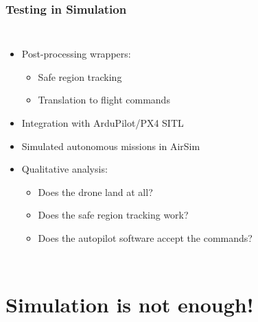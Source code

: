 \documentclass[aspectratio=169]{rubeamer}
\newcommand{\nologo}{\setbeamertemplate{logo}{}}
\newif\ifpause
\newcommand{\mypause}{\ifpause \pause \fi}
\begin{document}
\begin{frame}
  \frametitle{Testing in Simulation}
  \begin{columns}
    \begin{itemize}
      \item Post-processing wrappers:
      \begin{itemize}
        \item Safe region tracking
        \mypause
        \item Translation to flight commands
      \end{itemize}
      \mypause
      \item Integration with ArduPilot/PX4 SITL
      \mypause
      \item Simulated autonomous missions in AirSim
      \mypause
      \item Qualitative analysis:
      \begin{itemize}
        \item Does the drone land at all?
        \mypause
        \item Does the safe region tracking work?
        \mypause
        \item Does the autopilot software accept the commands?
      \end{itemize}
    \end{itemize}
    \centering
  \end{columns}
\end{frame}

\section{Simulation is not enough!}

\end{document}

